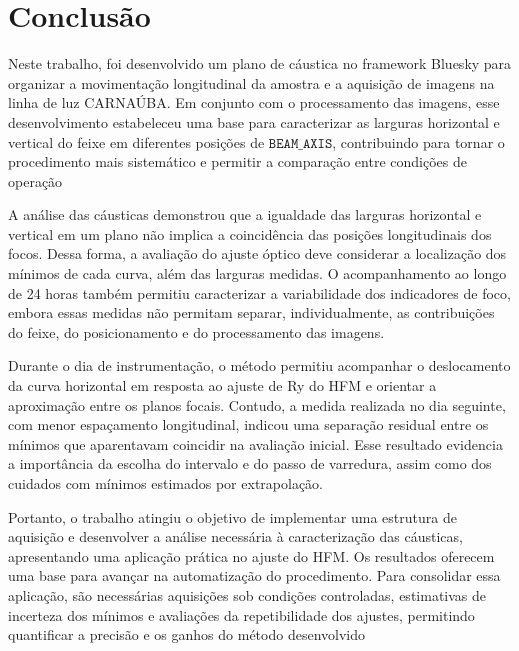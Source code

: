 \documentclass[12pt,a4paper]{article}
\makeatletter
\newcommand{\rotulosecao}[2]{%
    \phantomsection
    \def\@currentlabelname{#2}%
    \label{#1}%
}
\makeatother
\begin{document}

\clearpage
\newpage
{}
\section*{Conclusão}
\rotulosecao{sec:conclusao}{Conclusão}

Neste trabalho, foi desenvolvido um plano de cáustica no framework Bluesky para organizar a movimentação longitudinal da amostra e a aquisição de imagens na linha de luz CARNAÚBA. Em conjunto com o processamento das imagens, esse desenvolvimento estabeleceu uma base para caracterizar as larguras horizontal e vertical do feixe em diferentes posições de $\texttt{BEAM\_AXIS}$, contribuindo para tornar o procedimento mais sistemático e permitir a comparação entre condições de operação

A análise das cáusticas demonstrou que a igualdade das larguras horizontal e vertical em um plano não implica a coincidência das posições longitudinais dos focos. Dessa forma, a avaliação do ajuste óptico deve considerar a localização dos mínimos de cada curva, além das larguras medidas. O acompanhamento ao longo de 24 horas também permitiu caracterizar a variabilidade dos indicadores de foco, embora essas medidas não permitam separar, individualmente, as contribuições do feixe, do posicionamento e do processamento das imagens.

Durante o dia de instrumentação, o método permitiu acompanhar o deslocamento da curva horizontal em resposta ao ajuste de Ry do HFM e orientar a aproximação entre os planos focais. Contudo, a medida realizada no dia seguinte, com menor espaçamento longitudinal, indicou uma separação residual entre os mínimos que aparentavam coincidir na avaliação inicial. Esse resultado evidencia a importância da escolha do intervalo e do passo de varredura, assim como dos cuidados com mínimos estimados por extrapolação.

Portanto, o trabalho atingiu o objetivo de implementar uma estrutura de aquisição e desenvolver a análise necessária à caracterização das cáusticas, apresentando uma aplicação prática no ajuste do HFM. Os resultados oferecem uma base para avançar na automatização do procedimento. Para consolidar essa aplicação, são necessárias aquisições sob condições controladas, estimativas de incerteza dos mínimos e avaliações da repetibilidade dos ajustes, permitindo quantificar a precisão e os ganhos do método desenvolvido
\end{document}
